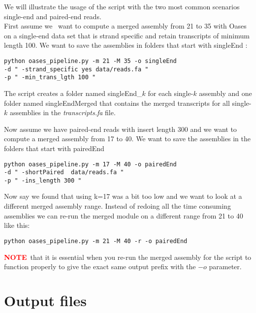 \documentclass[12pt]{article}
\newcommand{\NOTE}{\textcolor{red}{\textbf{NOTE}}}
\begin{document}
We will illustrate the usage of the script with the two most common scenarios single-end and paired-end reads. \\
First assume we \ want to compute a merged assembly from 21 to 35 with Oases on a single-end data set that is strand specific and retain transcripts of minimum length 100. We want to save the assemblies in folders that start with singleEnd :
\begin{verbatim}
python oases_pipeline.py -m 21 -M 35 -o singleEnd 
-d " -strand_specific yes data/reads.fa "
-p " -min_trans_lgth 100 " 
\end{verbatim}

The script creates a folder named singleEnd\_$k$ for each single-$k$ assembly and one folder named singleEndMerged that contains the merged transcripts for all single-$k$ assemblies in the \emph{transcripts.fa} file.

Now assume we have paired-end reads with insert length 300 and we want to compute a merged assembly from 17 to 40. We want to save the assemblies in the folders that start with pairedEnd
\begin{verbatim}
python oases_pipeline.py -m 17 -M 40 -o pairedEnd 
-d " -shortPaired  data/reads.fa "
-p " -ins_length 300 "
\end{verbatim}
Now say we found that using k=17 was a bit too low and we want to look at a different merged assembly range. Instead of redoing all the time consuming assemblies we can re-run the merged module on a different range from 21 to 40 like this:
\begin{verbatim}
python oases_pipeline.py -m 21 -M 40 -r -o pairedEnd  
\end{verbatim}
\NOTE \  that it is essential when you re-run the merged assembly for the script to function properly to give the exact same output prefix with the $-o$ parameter.
\section{Output files}
\end{document}
